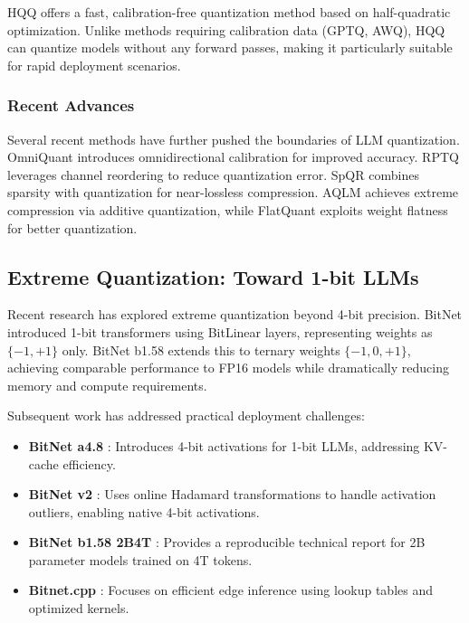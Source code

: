 \documentclass[11pt]{article}
\begin{document}
HQQ \cite{badri2023hqq} offers a fast, calibration-free quantization method based on half-quadratic optimization. Unlike methods requiring calibration data (GPTQ, AWQ), HQQ can quantize models without any forward passes, making it particularly suitable for rapid deployment scenarios.

\subsubsection{Recent Advances}

Several recent methods have further pushed the boundaries of LLM quantization. OmniQuant \cite{shao2024omniquant} introduces omnidirectional calibration for improved accuracy. RPTQ \cite{yuan2023rptq} leverages channel reordering to reduce quantization error. SpQR \cite{dettmers2023spqr} combines sparsity with quantization for near-lossless compression. AQLM \cite{egiazarian2024aqlm} achieves extreme compression via additive quantization, while FlatQuant \cite{sun2024flatquant} exploits weight flatness for better quantization.

\subsection{Extreme Quantization: Toward 1-bit LLMs}

Recent research has explored extreme quantization beyond 4-bit precision. BitNet \cite{wang2023bitnet} introduced 1-bit transformers using BitLinear layers, representing weights as $\{-1, +1\}$ only. BitNet b1.58 \cite{ma2024era1bit} extends this to ternary weights $\{-1, 0, +1\}$, achieving comparable performance to FP16 models while dramatically reducing memory and compute requirements.

Subsequent work has addressed practical deployment challenges:
\begin{itemize}
    \item \textbf{BitNet a4.8} \cite{wang2024bitneta48}: Introduces 4-bit activations for 1-bit LLMs, addressing KV-cache efficiency.
    \item \textbf{BitNet v2} \cite{wang2025bitnetv2}: Uses online Hadamard transformations to handle activation outliers, enabling native 4-bit activations.
    \item \textbf{BitNet b1.58 2B4T} \cite{ma2025bitnet2b4t}: Provides a reproducible technical report for 2B parameter models trained on 4T tokens.
    \item \textbf{Bitnet.cpp} \cite{zhang2025bitnetcpp, bitnetgithub}: Focuses on efficient edge inference using lookup tables and optimized kernels.
\end{itemize}
\end{document}
